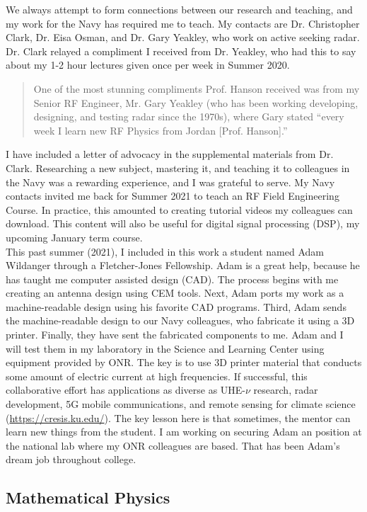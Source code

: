 \documentclass[../../../main.tex]{subfiles}
\begin{document}
We always attempt to form connections between our research and teaching, and my work for the Navy has required me to teach.  My contacts are Dr. Christopher Clark, Dr. Eisa Osman, and Dr. Gary Yeakley, who work on active seeking radar.  Dr. Clark relayed a compliment I received from Dr. Yeakley, who had this to say about my 1-2 hour lectures given once per week in Summer 2020.
\begin{quote}
One of the most stunning compliments Prof. Hanson received was from my Senior RF Engineer, Mr. Gary Yeakley (who has been working developing, designing, and testing radar since the 1970s), where Gary stated ``every week I learn new RF Physics from Jordan [Prof. Hanson].''
\end{quote}
I have included a letter of advocacy in the supplemental materials from Dr. Clark.  Researching a new subject, mastering it, and teaching it to colleagues in the Navy was a rewarding experience, and I was grateful to serve.  My Navy contacts invited me back for Summer 2021 to teach an RF Field Engineering Course.  In practice, this amounted to creating tutorial videos my colleagues can download.  This content will also be useful for digital signal processing (DSP), my upcoming January term course.
\\
\vspace{0.25cm}
This past summer (2021), I included in this work a student named Adam Wildanger through a Fletcher-Jones Fellowship.  Adam is a great help, because he has taught me computer assisted design (CAD).  The process begins with me creating an antenna design using CEM tools.  Next, Adam ports my work as a machine-readable design using his favorite CAD programs.  Third, Adam sends the machine-readable design to our Navy colleagues, who fabricate it using a 3D printer.  Finally, they have sent the fabricated components to me.  Adam and I will test them in my laboratory in the Science and Learning Center using equipment provided by ONR.  The key is to use 3D printer material that conducts some amount of electric current at high frequencies.  If successful, this collaborative effort has applications as diverse as UHE-$\nu$ research, radar development, 5G mobile communications, and remote sensing for climate science (\url{https://cresis.ku.edu/}).  The key lesson here is that sometimes, the mentor can learn new things from the student.  I am working on securing Adam an position at the national lab where my ONR colleagues are based.  That has been Adam's dream job throughout college.

\subsection{Mathematical Physics}
\label{sec:math_phys}
\end{document}
